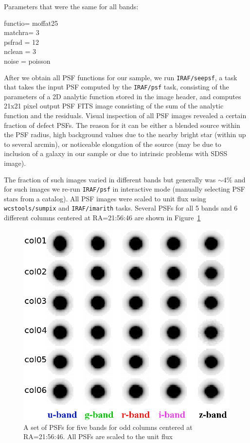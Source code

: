 Parameters that were the same for all bands:\\
\begin{tt}
functio=             moffat25\\
matchra=                   3\\
psfrad =                  12\\
nclean =                    3\\
noise  =              poisson\\
	\end{tt}

After we obtain all PSF functions for our sample, we run {\tt IRAF/seepsf}, a task that takes the input PSF computed by the {\tt IRAF/psf} task, consisting of the parameters of a 2D analytic function stored in the image header, and computes 21x21 pixel output PSF FITS image consisting of the sum of the analytic function and the residuals. Visual inspection of all PSF images revealed a certain fraction of defect PSFs. The reason for it can be either a blended source within the PSF radius, high background values due to the nearby bright star (within up to several arcmin), or noticeable elongation of the source (may be due to inclusion of a galaxy in our sample or due to intrinsic problems with SDSS image).

The fraction of such images varied in different bands but generally was $\sim 4\%$ and for such images we re-run {\tt IRAF/psf} in interactive mode (manually selecting PSF stars from a catalog). All PSF images were scaled to unit flux using {\tt wcstools/sumpix} \citep{Mink1998b} and {\tt IRAF/imarith} tasks. Several PSFs for all 5 bands and 6 different columns centered at RA=21:56:46 are shown in Figure~\ref{fig:psf}

\begin{figure}[!ht]
\includegraphics[width=6in]{Figures/psf_allbands_6cols.png}
\caption{A set of PSFs for five bands for odd columns centered at RA=21:56:46. All PSFs are scaled to the unit flux}
\label{fig:psf}
\end{figure}

